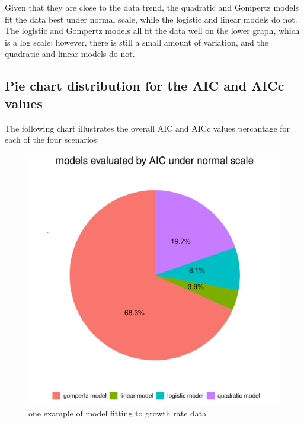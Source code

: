 \documentclass[11pt]{article}
\begin{document}
Given that they are close to the data trend, the quadratic and Gompertz models fit the data best under normal scale, while the logistic and linear models do not. The logistic and Gompertz models all fit the data well on the lower graph, which is a log scale; however, there is still a small amount of variation, and the quadratic and linear models do not.
\subsection{Pie chart distribution for the AIC and AICc values}
The following chart illustrates the overall AIC and AICc values percantage for each of the four scenarios:

\begin{figure}[H]
    \centering
    \includegraphics[scale=0.3]{AIC_norm.pdf}
    \caption{one example of model fitting to growth rate data}
    \label{fig.2}
\end{figure}
\end{document}
